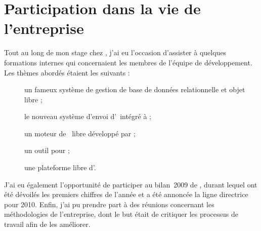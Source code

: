 \section{Participation dans la vie de l'entreprise}

Tout au long de mon stage chez \asl, j'ai eu l'occasion d'assister à quelques formations internes qui concernaient les membres de l'équipe de développement. Les thèmes abordés étaient les suivants :

\begin{description}
	\item[\apsql] un fameux système de gestion de base de données relationnelle et objet libre ;
	\item[\aswift] le nouveau système d'envoi d'\aemails\ intégré à \asf ;
	\item[\atwig] un moteur de \atemplate\ libre développé par \apotencier ;
	\item[\asvnmerge] un outil pour \asvn ;
	\item[\amagento] une plateforme libre d'\aecommerce.
\end{description}

J'ai eu également l'opportunité de participer au bilan~2009 de \asensio, durant lequel ont été dévoilés les premiers chiffres de l'année et a été annoncée la ligne directrice pour 2010. Enfin, j'ai pu prendre part à des réunions concernant les méthodologies de l'entreprise, dont le but était de critiquer les processus de travail afin de les améliorer.

